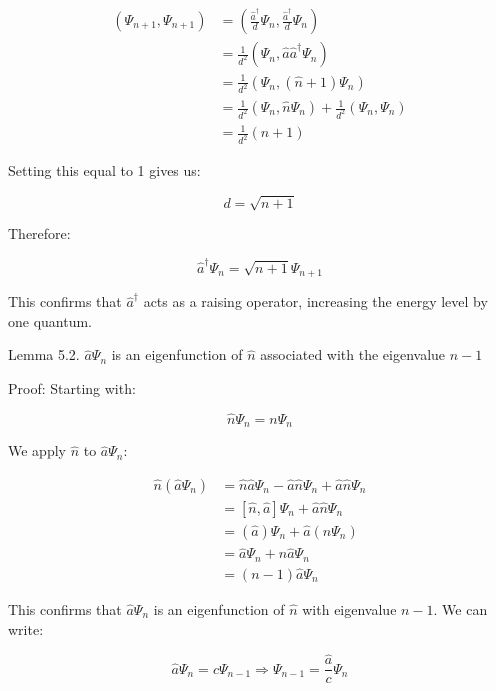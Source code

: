 \documentclass[10pt]{article}
\begin{document}
\begin{align*}
(\Psi_{n+1}, \Psi_{n+1}) &= \left(\frac{\hat{a}^\dagger}{d}\Psi_n, \frac{\hat{a}^\dagger}{d}\Psi_n\right) \\
&= \frac{1}{d^2}(\Psi_n, \hat{a}\hat{a}^\dagger\Psi_n) \\
&= \frac{1}{d^2}(\Psi_n, (\hat{n}+1)\Psi_n) \tag{5.26} \\
&= \frac{1}{d^2}(\Psi_n, \hat{n}\Psi_n) + \frac{1}{d^2}(\Psi_n, \Psi_n) \\
&= \frac{1}{d^2}(n+1)
\end{align*}

Setting this equal to 1 gives us:

\begin{equation*}
d = \sqrt{n+1} \tag{5.27}
\end{equation*}

Therefore:

\begin{equation*}
\hat{a}^\dagger\Psi_n = \sqrt{n+1}\Psi_{n+1} \tag{5.28}
\end{equation*}

This confirms that $\hat{a}^\dagger$ acts as a raising operator, increasing the energy level by one quantum.

Lemma 5.2. $\hat{a}\Psi_n$ is an eigenfunction of $\hat{n}$ associated with the eigenvalue $n-1$

Proof:
Starting with:

\begin{equation*}
\hat{n}\Psi_n = n\Psi_n \tag{5.29}
\end{equation*}

We apply $\hat{n}$ to $\hat{a}\Psi_n$:

\begin{align*}
\hat{n}(\hat{a}\Psi_n) &= \hat{n}\hat{a}\Psi_n - \hat{a}\hat{n}\Psi_n + \hat{a}\hat{n}\Psi_n \\
&= [\hat{n}, \hat{a}]\Psi_n + \hat{a}\hat{n}\Psi_n \\
&= (\hat{a})\Psi_n + \hat{a}(n\Psi_n) \tag{5.30} \\
&= \hat{a}\Psi_n + n\hat{a}\Psi_n \\
&= (n-1)\hat{a}\Psi_n
\end{align*}

This confirms that $\hat{a}\Psi_n$ is an eigenfunction of $\hat{n}$ with eigenvalue $n-1$. We can write:

\begin{equation*}
\hat{a}\Psi_n = c\Psi_{n-1} \Longrightarrow \Psi_{n-1} = \frac{\hat{a}}{c}\Psi_n \tag{5.31}
\end{equation*}
\end{document}
